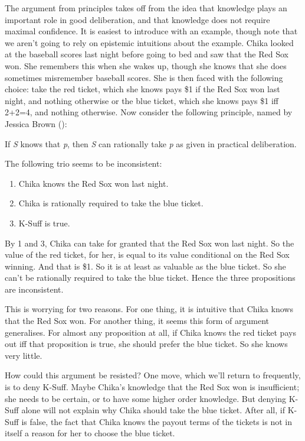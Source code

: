 \documentclass[
  10pt,
  letterpaper,
  DIV=11,
  numbers=noendperiod,
  twoside]{scrartcl}
\providecommand{\tightlist}{%
  \setlength{\itemsep}{0pt}\setlength{\parskip}{0pt}}\usepackage{longtable,booktabs,array}
\begin{document}
The argument from principles takes off from the idea that knowledge
plays an important role in good deliberation, and that knowledge does
not require maximal confidence. It is easiest to introduce with an
example, though note that we aren't going to rely on epistemic
intuitions about the example. Chika looked at the baseball scores last
night before going to bed and saw that the Red Sox won. She remembers
this when she wakes up, though she knows that she does sometimes
misremember baseball scores. She is then faced with the following
choice: take the red ticket, which she knows pays \$1 if the Red Sox won
last night, and nothing otherwise or the blue ticket, which she knows
pays \$1 iff 2+2=4, and nothing otherwise. Now consider the following
principle, named by Jessica Brown ():

\begin{description}
\tightlist
\item[K-Suff]
If \emph{S} knows that \emph{p}, then \emph{S} can rationally take
\emph{p} as given in practical deliberation.
\end{description}

The following trio seems to be inconsistent:

\begin{enumerate}
\def\labelenumi{\arabic{enumi}.}
\tightlist
\item
  Chika knows the Red Sox won last night.
\item
  Chika is rationally required to take the blue ticket.
\item
  K-Suff is true.
\end{enumerate}

By 1 and 3, Chika can take for granted that the Red Sox won last night.
So the value of the red ticket, for her, is equal to its value
conditional on the Red Sox winning. And that is \$1. So it is at least
as valuable as the blue ticket. So she can't be rationally required to
take the blue ticket. Hence the three propositions are inconsistent.

This is worrying for two reasons. For one thing, it is intuitive that
Chika knows that the Red Sox won. For another thing, it seems this form
of argument generalises. For almost any proposition at all, if Chika
knows the red ticket pays out iff that proposition is true, she should
prefer the blue ticket. So she knows very little.

How could this argument be resisted? One move, which we'll return to
frequently, is to deny K-Suff. Maybe Chika's knowledge that the Red Sox
won is insufficient; she needs to be certain, or to have some higher
order knowledge. But denying K-Suff alone will not explain why Chika
should take the blue ticket. After all, if K-Suff is false, the fact
that Chika knows the payout terms of the tickets is not in itself a
reason for her to choose the blue ticket.
\end{document}
